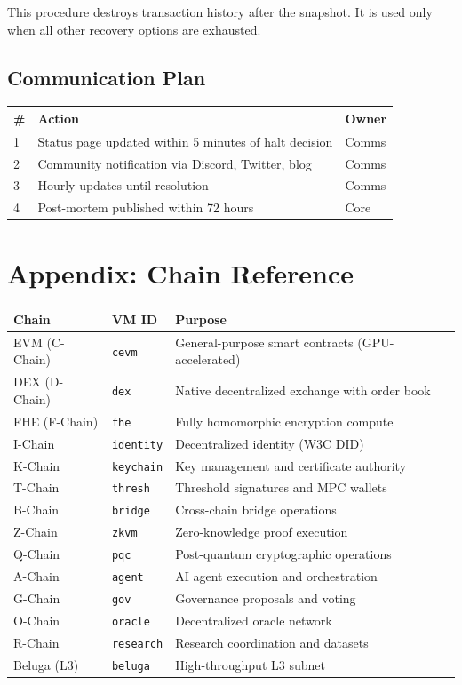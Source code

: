 \documentclass[11pt,letterpaper]{article}
\begin{document}
\noindent This procedure destroys transaction history after the snapshot.
It is used only when all other recovery options are exhausted.

\subsection{Communication Plan}

\begin{tabularx}{\textwidth}{@{}l X l@{}}
\toprule
\textbf{\#} & \textbf{Action} & \textbf{Owner} \\
\midrule
1 & Status page updated within 5 minutes of halt decision         & Comms  \\
2 & Community notification via Discord, Twitter, blog              & Comms  \\
3 & Hourly updates until resolution                                & Comms  \\
4 & Post-mortem published within 72 hours                          & Core   \\
\bottomrule
\end{tabularx}

\section{Appendix: Chain Reference}

\begin{tabularx}{\textwidth}{@{}l l X@{}}
\toprule
\textbf{Chain} & \textbf{VM ID} & \textbf{Purpose} \\
\midrule
EVM (C-Chain)  & \texttt{cevm}    & General-purpose smart contracts (GPU-accelerated) \\
DEX (D-Chain)  & \texttt{dex}     & Native decentralized exchange with order book \\
FHE (F-Chain)  & \texttt{fhe}     & Fully homomorphic encryption compute \\
I-Chain        & \texttt{identity}& Decentralized identity (W3C DID) \\
K-Chain        & \texttt{keychain}& Key management and certificate authority \\
T-Chain        & \texttt{thresh}  & Threshold signatures and MPC wallets \\
B-Chain        & \texttt{bridge}  & Cross-chain bridge operations \\
Z-Chain        & \texttt{zkvm}    & Zero-knowledge proof execution \\
Q-Chain        & \texttt{pqc}     & Post-quantum cryptographic operations \\
A-Chain        & \texttt{agent}   & AI agent execution and orchestration \\
G-Chain        & \texttt{gov}     & Governance proposals and voting \\
O-Chain        & \texttt{oracle}  & Decentralized oracle network \\
R-Chain        & \texttt{research}& Research coordination and datasets \\
Beluga (L3)    & \texttt{beluga}  & High-throughput L3 subnet \\
\bottomrule
\end{tabularx}
\end{document}
